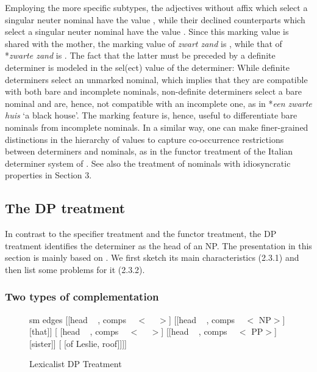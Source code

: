 \documentclass[output=paper]{langsci/langscibook}
\begin{document}
Employing the more specific subtypes, the adjectives without affix which select a singular 
neuter nominal have the value , while their declined counterparts which select 
a singular neuter nominal have the value . 
Since this {\sc marking} value is shared with the mother, the {\sc marking} value 
of \emph{zwart zand} is , while that of *\emph{zwarte zand} is . 
The fact that the latter must be preceded by a definite determiner
is modeled in the {\sc sel(ect)} value of the determiner: 
While definite determiners select an unmarked nominal, which implies that 
they are compatible with both bare and incomplete nominals,
non-definite determiners select a bare nominal and are, hence, not compatible 
with an incomplete one, as in *\emph{een zwarte huis} `a black house'. 
The {\sc marking} feature is, hence, useful to differentiate bare 
nominals from incomplete nominals.  
In a similar way, one can make finer-grained distinctions in the hierarchy of  
 values to capture co-occurrence restrictions between determiners and 
nominals, as in the functor treatment of the Italian determiner system of 
\citet{Allegranza06}. See also the treatment of nominals with idiosyncratic properties 
in Section 3. 


\subsection{The DP treatment} 


In contrast to the specifier treatment and the functor treatment, the DP 
treatment identifies the determiner as the head of an NP. The presentation in this section   
is mainly based on \citet{Netter94}. We first sketch its main characteristics (2.3.1)
and then list some problems for it (2.3.2). 


\subsubsection{Two types of complementation} 


\begin{figure}
	\centering
	\begin{forest}
sm edges
[{[{\sc head} ~   , {\sc comps} ~ $<$ ~ $>$]}
	[{[{\sc head} ~  , {\sc comps} ~ $<$ NP$>$]} [that]]
	[{ [{\sc head} ~   , {\sc comps} ~ $<$ ~ $>$]}
		[{[{\sc head} ~  , {\sc comps} ~ $<$ PP$>$]} [sister]]
		[ [of Leslie, roof]]]]
	\end{forest}
	\caption{\label{net} Lexicalist DP Treatment }
\end{figure}
\end{document}
